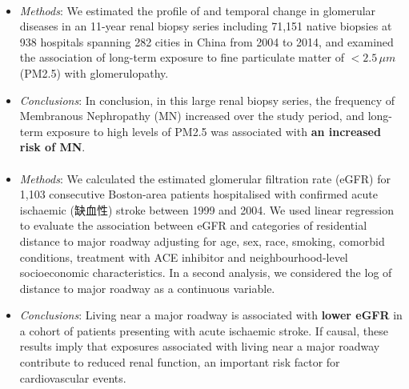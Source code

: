 \documentclass[11pt]{article}
\begin{document}
\paragraph{\citet{xu2016long}}
\begin{itemize}
    \item \textit{Methods}: We estimated the profile of and temporal change in glomerular diseases in an 11-year renal biopsy series including 71,151 native biopsies at 938 hospitals spanning 282 cities in China from 2004 to 2014, and examined the association of long-term exposure to fine particulate matter of $<2.5\,\mu m$ (PM2.5) with glomerulopathy. 
    \item \textit{Conclusions}: In conclusion, in this large renal biopsy series, the frequency of Membranous Nephropathy (MN) increased over the study period, and long-term exposure to high levels of PM2.5 was associated with \textbf{an increased risk of MN}.
\end{itemize}

\paragraph{\citet{lue2013residential}}
\begin{itemize}
    \item \textit{Methods}: We calculated the estimated glomerular filtration rate (eGFR) for 1,103 consecutive Boston-area patients hospitalised with confirmed acute ischaemic (缺血性) stroke between 1999 and 2004. We used linear regression to evaluate the association between eGFR and categories of residential distance to major roadway adjusting for age, sex, race, smoking, comorbid conditions, treatment with ACE inhibitor and neighbourhood-level socioeconomic characteristics. In a second analysis, we considered the log of distance to major roadway as a continuous variable.
    \item \textit{Conclusions}: Living near a major roadway is associated with \textbf{lower eGFR} in a cohort of patients presenting with acute ischaemic stroke. If causal, these results imply that exposures associated with living near a major roadway contribute to reduced renal function, an important risk factor for cardiovascular events.
\end{itemize}
\end{document}
